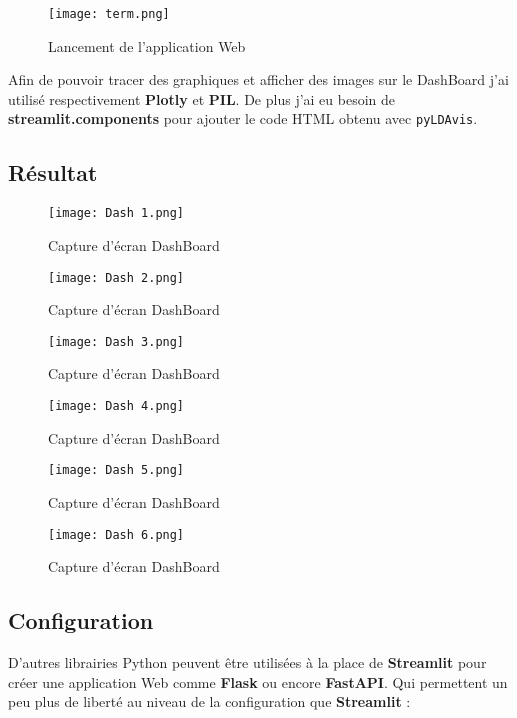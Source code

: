 \documentclass[a4paper,french,12pt]{article}
\begin{document}
\begin{figure}[!h]
    \centering
    \texttt{[image: term.png]}
    \caption{Lancement de l'application Web}
\end{figure}

Afin de pouvoir tracer des graphiques et afficher des images sur le DashBoard j'ai utilisé respectivement \textbf{Plotly} et \textbf{PIL}. De plus j'ai eu besoin de \textbf{streamlit.components} pour ajouter le code HTML obtenu avec \verb|pyLDAvis|.

\subsection{Résultat}

\begin{figure}[!h]
    \centering
    \texttt{[image: Dash 1.png]}
    \caption{Capture d'écran DashBoard}
\end{figure}

\begin{figure}[!h]
    \centering
    \texttt{[image: Dash 2.png]}
    \caption{Capture d'écran DashBoard}
\end{figure}

\begin{figure}[!h]
    \centering
    \texttt{[image: Dash 3.png]}
    \caption{Capture d'écran DashBoard}
\end{figure}

\begin{figure}[!h]
    \centering
    \texttt{[image: Dash 4.png]}
    \caption{Capture d'écran DashBoard}
\end{figure}

\begin{figure}[!h]
    \centering
    \texttt{[image: Dash 5.png]}
    \caption{Capture d'écran DashBoard}
\end{figure}

\clearpage

\begin{figure}[!h]
    \centering
    \texttt{[image: Dash 6.png]}
    \caption{Capture d'écran DashBoard}
\end{figure}

\subsection{Configuration}

D'autres librairies Python peuvent être utilisées à la place de \textbf{Streamlit} pour créer une application Web comme \textbf{Flask} ou encore \textbf{FastAPI}. Qui permettent un peu plus de liberté au niveau de la configuration que \textbf{Streamlit} :
\end{document}
